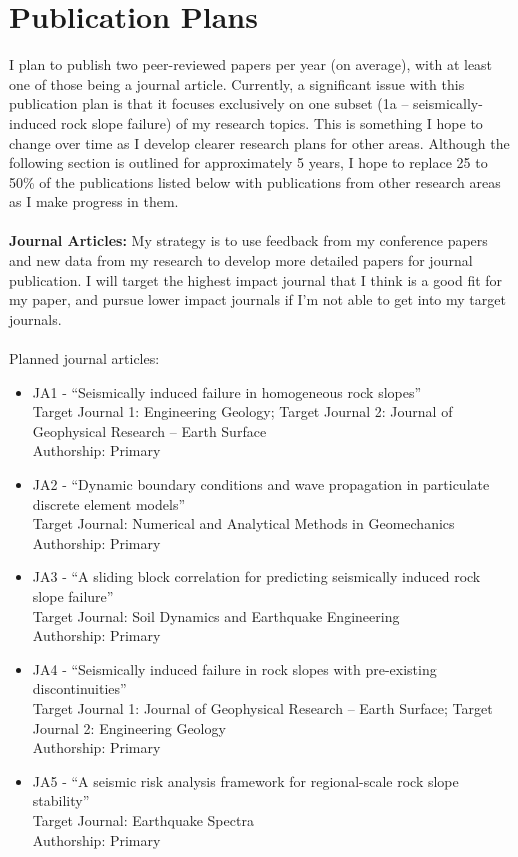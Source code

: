 \documentclass[10pt,letterpaper]{article}
\begin{document}
\section{Publication Plans}
I plan to publish two peer-reviewed papers per year (on average), with at least one of those being a journal article.
Currently, a significant issue with this publication plan is that it focuses exclusively on one subset (1a -- seismically-induced rock slope failure) of my research topics.
This is something I hope to change over time as I develop clearer research plans for other areas. 
Although the following section is outlined for approximately 5 years, I hope to replace 25 to 50\% of the publications listed below with publications from other research areas as I make progress in them.
\\
\\
\noindent \textbf{Journal Articles:} My strategy is to use feedback from my conference papers and new data from my research to develop more detailed papers for journal publication. 
I will target the highest impact journal that I think is a good fit for my paper, and pursue lower impact journals if I'm not able to get into my target journals.
\\
\\
\noindent Planned journal articles:
\begin{itemize}
\item JA1 - ``Seismically induced failure in homogeneous rock slopes''
\\Target Journal 1: Engineering Geology; Target Journal 2: Journal of Geophysical Research -- Earth Surface
\\ Authorship: Primary
\item JA2 - ``Dynamic boundary conditions and wave propagation in particulate discrete element models''
\\Target Journal: Numerical and Analytical Methods in Geomechanics
\\ Authorship: Primary
\item JA3 - ``A sliding block correlation for predicting seismically induced rock slope failure''
\\ Target Journal: Soil Dynamics and Earthquake Engineering
\\ Authorship: Primary
\item JA4 - ``Seismically induced failure in rock slopes with pre-existing discontinuities''
\\ Target Journal 1: Journal of Geophysical Research -- Earth Surface; Target Journal 2: Engineering Geology
\\ Authorship: Primary
\item JA5 - ``A seismic risk analysis framework for regional-scale rock slope stability''
\\ Target Journal: Earthquake Spectra
\\ Authorship: Primary
\end{itemize}
\end{document}
